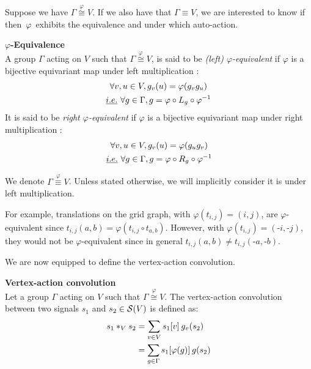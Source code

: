Suppose we have $\Gamma \overset{\varphi}{\cong} V$. If we also have that $\Gamma \equiv V$, we are interested to know if then~$\varphi$~exhibits the equivalence and under which auto-action.

\begin{definition}\textbf{$\varphi$-Equivalence}\\
A group $\Gamma$ acting on $V$ such that $\Gamma \overset{\varphi}{\cong} V$, is said to be \emph{(left) $\varphi$-equivalent} if $\varphi$ is a bijective equivariant map under left multiplication \ie:
\begin{gather}
\forall v, u \in V, g_v(u) = \varphi(g_vg_u) \label{eq:P}\\
\ie \forall g \in \Gamma, g = \varphi \circ L_g \circ \varphi^{-1} \label{eq:PP}
\end{gather}
It is said to be \emph{right $\varphi$-equivalent} if $\varphi$ is a bijective equivariant map under right multiplication \ie:
\begin{gather}
\forall v, u \in V, g_v(u) = \varphi(g_ug_v) \label{eq:PPP}\\
\ie \forall g \in \Gamma, g = \varphi \circ R_g \circ \varphi^{-1}
\end{gather}
\end{definition}

We denote $\Gamma \overset{\varphi}{\equiv} V$. Unless stated otherwise, we will implicitly consider it is under left multiplication.

\begin{remark}
For example, translations on the grid graph, with $\varphi(t_{i,j}) = (i,j)$, are $\varphi$-equivalent since $t_{i,j}(a,b) = \varphi(t_{i,j} \circ t_{a,b})$. However, with $\varphi(t_{i,j}) = (\text{-}i,\text{-}j)$, they would not be $\varphi$-equivalent since in general $t_{i,j}(a,b) \neq t_{i,j}(\text{-}a,\text{-}b)$.
\end{remark}

We are now equipped to define the vertex-action convolution.

\begin{definition}\textbf{Vertex-action convolution}\\
Let a group $\Gamma$ acting on $V$ such that $\Gamma \overset{\varphi}{\cong} V$.
The vertex-action convolution between two signals $s_1$ and $s_2 \in \cs(V)$ is defined as:
\begin{align}
s_1 \ast_V s_2 & = \displaystyle \sum_{v \in V} s_1[v] \h{2} g_v(s_2)\label{eq:vdom}\\
& = \displaystyle \sum_{g \in \Gamma} s_1[\varphi(g)] \h{2} g(s_2) \label{eq:premix}
\end{align}
\label{def:conv3}
\end{definition}

